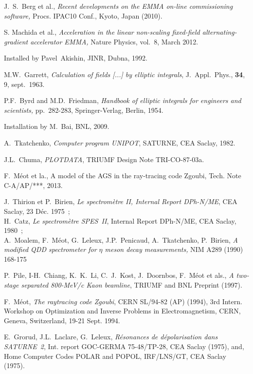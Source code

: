 \begin{thebibliography}{99}
J.~S.~Berg et al., 
\textsl{Recent developments on the EMMA on-line commissioning software,} 
Procs. IPAC10 Conf., Kyoto, Japan (2010). 

S. Machida et al., 
\textsl{Acceleration in the linear non-scaling fixed-field alternating-gradient accelerator EMMA, }
Nature Physics, vol.~8, March 2012.

 Installed by Pavel~Akishin, JINR, Dubna, 1992.

M.W.~Garrett, 
\textsl{Calculation of fields  [...] by elliptic integrals}, 
J.~Appl.~Phys., \textbf{34}, 9, sept.~1963.  

P.F.~Byrd and M.D.~Friedman, 
\textsl{Handbook of elliptic integrals for engineers and scientists,} 
pp.~282-283, Springer-Verlag, Berlin, 1954.  

 Installation by M.~Bai, BNL, 2009.  

A.~Tkatchenko, 
\textsl{Computer program UNIPOT}, 
SATURNE, CEA Saclay, 1982. 

J.L.~Chuma, 
\textsl{PLOTDATA}, 
TRIUMF Design Note TRI-CO-87-03a.

F.~M\'eot et la., 
A model of the AGS in the ray-tracing code Zgoubi, 
Tech. Note C-A/AP/***, 2013. 

J.~Thirion et P.~Birien, 
\textsl{Le spectrom\`etre II, Internal Report DPh-N/ME}, 
CEA Saclay, 23 D\'ec. 1975~; \\
H.~Catz, 
\textsl{Le spectrom\`etre SPES~II}, Internal Report DPh-N/ME, CEA Saclay, 1980~; \\
 A.~Moalem, F.~M\'eot, G.~Leleux, J.P.~Penicaud, A.~Tkatchenko, P.~Birien,  
\textsl{A modified QDD spectrometer for $\eta$ meson decay measurements,  } 
NIM A289 (1990) 168-175 

P.~Pile, I-H.~Chiang, K.~K.~Li, C.~J.~Kost, J.~Doornbos, F.~M\'eot et als., 
\textsl{A two-stage separated 800-MeV/c Kaon beamline}, 
 TRIUMF and BNL Preprint (1997).

F.~M\'eot, 
\textsl{The raytracing code Zgoubi}, CERN SL/94-82 (AP) (1994), 
3rd Intern. Workshop on Optimization and Inverse Problems 
in Electromagnetism, CERN, Geneva, Switzerland, 19-21 Sept. 1994. 

E.~Grorud, J.L.~Laclare, G.~Leleux, 
\textsl{R\'esonances de d\'epolarisation dans SATURNE~2}, 
Int. report GOC-GERMA 75-48/TP-28, CEA Saclay (1975), 
and, Home Computer Codes POLAR and POPOL, IRF/LNS/GT, CEA Saclay (1975).


\end{thebibliography}
